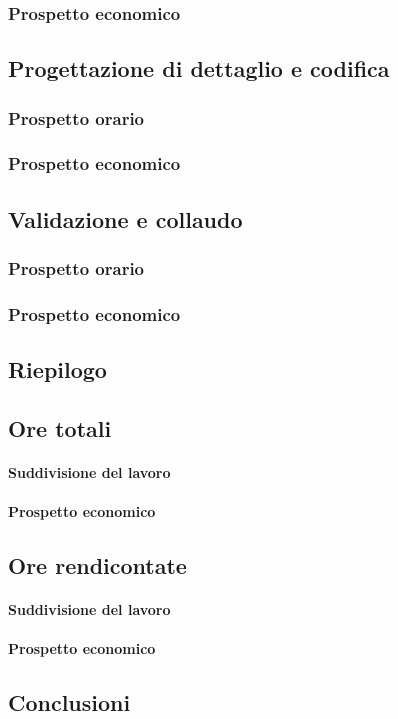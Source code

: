     \subsubsection{Prospetto economico}
\subsection{Progettazione di dettaglio e codifica}
    \subsubsection{Prospetto orario}
    \subsubsection{Prospetto economico}
\subsection{Validazione e collaudo}
    \subsubsection{Prospetto orario}
    \subsubsection{Prospetto economico}
\subsection{Riepilogo}
    \subsection{Ore totali}
        \paragraph{Suddivisione del lavoro}
        \paragraph{Prospetto economico}
    \subsection{Ore rendicontate}
        \paragraph{Suddivisione del lavoro}
        \paragraph{Prospetto economico}
    \subsection{Conclusioni}